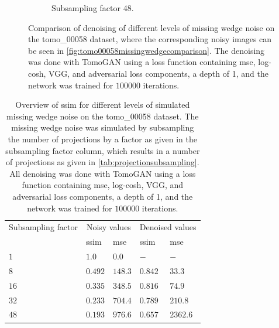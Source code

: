 \begin{figure}
\begin{subfigure}[t]{.45\textwidth}
    \caption{Subsampling factor 48. }
  \end{subfigure}
  \caption[Denoising of four different levels of missing wedge noise]{Comparison of denoising of different levels of missing wedge noise on the tomo\_00058 dataset, where the corresponding noisy images can be seen in \cref{fig:tomo00058missingwedgecomparison}. The denoising was done with TomoGAN using a loss function containing \acrshort{mse}, log-cosh, VGG, and adversarial loss components, a depth of 1, and the network was trained for $100 000$ iterations. }
  \label{fig:tomo00058missingwedgecomparisondenoised}
\end{figure}

\begin{table}[htbp]
  \centering
  \caption[SSIM for different levels of simulated missing wedge noise and corresponding values after denoising]{Overview of \acrshort{ssim} for different levels of simulated missing wedge noise on the tomo\_00058 dataset. The missing wedge noise was simulated by subsampling the number of projections by a factor as given in the subsampling factor column, which results in a number of projections as given in \cref{tab:projectionsubsampling}. All denoising was done with TomoGAN using a loss function containing \acrshort{mse}, log-cosh, VGG, and adversarial loss components, a depth of 1, and the network was trained for $100 000$ iterations. }
  \label{tab:missingwedgessim}
  \begin{tabular}{lllll}
  \hline
  Subsampling factor & \multicolumn{2}{c}{Noisy values} & \multicolumn{2}{c}{Denoised values} \\
  \hhline{=====}
  {} & \acrshort{ssim} & \acrshort{mse} & \acrshort{ssim} & \acrshort{mse} \\
  \hline
  $1$  & $1.0$ & $0.0$ & $-$ & $-$ \\
  $8$  & $0.492$ & $148.3$ & $0.842$ & $33.3$ \\
  $16$ & $0.335$ & $348.5$ & $0.816$ & $74.9$ \\
  $32$ & $0.233$ & $704.4$ & $0.789$ & $210.8$ \\
  $48$ & $0.193$ & $976.6$ & $0.657$ & $2362.6$ \\
  \hline
  \end{tabular}
\end{table}

